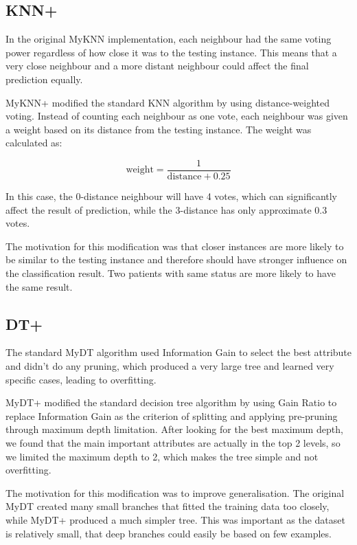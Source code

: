 \documentclass[12pt,a4paper]{article}
\begin{document}
\subsection{KNN+}

In the original MyKNN implementation, each neighbour had the same voting power regardless of how close it was to the testing instance. This means that a very close neighbour and a more distant neighbour could affect the final prediction equally.

MyKNN+ modified the standard KNN algorithm by using distance-weighted voting. Instead of counting each neighbour as one vote, each neighbour was given a weight based on its distance from the testing instance. The weight was calculated as:

\[
\mathrm{weight} = \frac{1}{\mathrm{distance} + 0.25}
\]

In this case, the 0-distance neighbour will have 4 votes, which can significantly affect the result of prediction, while the 3-distance has only approximate 0.3 votes.

The motivation for this modification was that closer instances are more likely to be similar to the testing instance and therefore should have stronger influence on the classification result. Two patients with same status are more likely to have the same result.

\subsection{DT+}

The standard MyDT algorithm used Information Gain to select the best attribute and didn't do any pruning, which produced a very large tree and learned very specific cases, leading to overfitting.

MyDT+ modified the standard decision tree algorithm by using Gain Ratio to replace Information Gain as the criterion of splitting and applying pre-pruning through maximum depth limitation. After looking for the best maximum depth, we found that the main important attributes are actually in the top 2 levels, so we limited the maximum depth to 2, which makes the tree simple and not overfitting.

The motivation for this modification was to improve generalisation. The original MyDT created many small branches that fitted the training data too closely, while MyDT+ produced a much simpler tree. This was important as the dataset is relatively small, that deep branches could easily be based on few examples.
\end{document}
